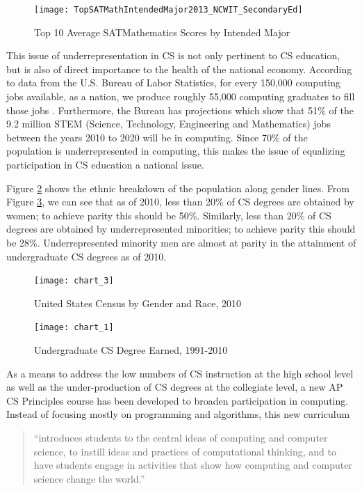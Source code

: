 \documentclass[twoside,openright,titlepage,numbers=noenddot,headinclude,%
               footinclude=true,cleardoublepage=empty,abstractoff,BCOR=5mm,%
               paper=a4,fontsize=11pt,ngerman,american]{scrreprt}
\numberwithin{theorem}{chapter}
\numberwithin{definition}{chapter}
\numberwithin{algorithm}{chapter}
\numberwithin{figure}{chapter}
\numberwithin{table}{chapter}
\numberwithin{equation}{chapter}
\begin{document}
\begin{figure}[hbtp]
  \centering
  \texttt{[image: TopSATMathIntendedMajor2013\_NCWIT\_SecondaryEd]}
   \caption{Top 10 Average SATMathematics Scores by Intended Major}
   \label{satMathMajor}
\end{figure}

This issue of underrepresentation in CS is not only pertinent to CS education, but is also of direct importance to the health of the national economy. According to data from the U.S. Bureau of Labor Statistics, for every 150,000 computing jobs available, as a nation, we produce roughly 55,000 computing graduates to fill those jobs \cite{Labor-Statistics-BLS:aa}. Furthermore, the Bureau has projections which show that 51\% of the 9.2 million STEM (Science, Technology, Engineering and Mathematics) jobs between the years 2010 to 2020 will be in computing. Since 70\% of the population is underrepresented in computing, this makes the issue of equalizing participation in CS education a national issue. 

Figure \ref{popuGenderRace} shows the ethnic breakdown of the population along gender lines. From Figure \ref{popuCSUndergrad}, we can see that as of 2010, less than 20\% of CS degrees are obtained by women; to achieve parity this should be 50\%. Similarly, less than 20\% of CS degrees are obtained by underrepresented minorities; to achieve parity this should be 28\%. Underrepresented minority men are almost at parity in the attainment of undergraduate CS degrees as of 2010. 

\begin{figure}[hbtp]
  \centering
  \texttt{[image: chart\_3]}
  \caption{United States Census by Gender and Race, 2010}
  \label{popuGenderRace}
\end{figure}

\begin{figure}[hbtp]
  \centering
  \texttt{[image: chart\_1]}
   \caption{Undergraduate CS Degree Earned, 1991-2010}
  \label{popuCSUndergrad}
\end{figure}

As a means to address the low numbers of CS instruction at the high school level as well as the under-production of CS degrees at the collegiate level, a new AP CS Principles course has been developed to broaden participation in computing. Instead of focusing mostly on programming and algorithms, this new curriculum 
\begin{quote}
``introduces students to the central ideas of computing and computer science, to instill ideas and practices of computational thinking, and to have students engage in activities that show how computing and computer science change the world.'' \cite{Board:zr}
\end{quote}
\end{document}
